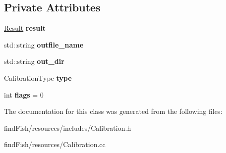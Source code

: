 \subsection*{Private Attributes}
\begin{DoxyCompactItemize}
\item 
\mbox{\label{class_calibration_a185c52f9d8f6673a484dcb7a9f4fc7f6}} 
\mbox{\hyperlink{struct_calibration_1_1_result}{Result}} {\bfseries result}
\item 
\mbox{\label{class_calibration_aea1d062d6760d58b211d7ef07c627fe8}} 
std\+::string {\bfseries outfile\+\_\+name}
\item 
\mbox{\label{class_calibration_a6a14f70047a0e3551bb4ec3cc534e1ff}} 
std\+::string {\bfseries out\+\_\+dir}
\item 
\mbox{\label{class_calibration_ad657fa2a1bf4bd691db2ecf4bc448f4a}} 
Calibration\+Type {\bfseries type}
\item 
\mbox{\label{class_calibration_a3955679c64ea0aaa6bf7c2c38e629b55}} 
int {\bfseries flags} = 0
\end{DoxyCompactItemize}


The documentation for this class was generated from the following files\+:\begin{DoxyCompactItemize}
\item 
find\+Fish/resources/includes/Calibration.\+h\item 
find\+Fish/resources/Calibration.\+cc\end{DoxyCompactItemize}
